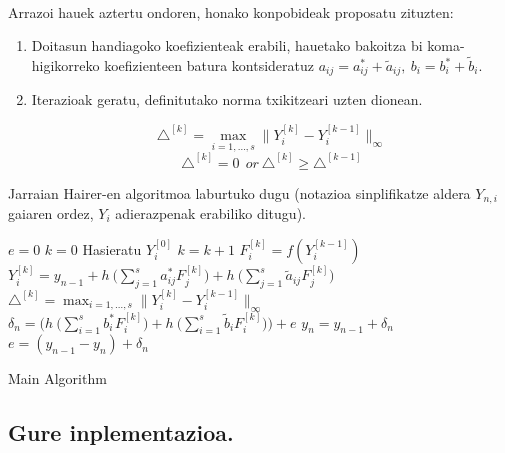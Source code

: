 \paragraph*{}Arrazoi hauek aztertu ondoren, honako konpobideak proposatu zituzten:

\begin{enumerate}
\item Doitasun handiagoko koefizienteak erabili, hauetako bakoitza bi koma-higikorreko koefizienteen batura kontsideratuz $a_{ij}= a^{\ast}_{ij}+\tilde a_{ij}, \ b_i= b^{\ast}_i+\tilde b_i$.
\item Iterazioak geratu, definitutako norma txikitzeari uzten dionean.

\[\triangle ^{[k]} = \max_{i=1,\dots,s}\|Y_i^{[k]}-Y_i^{[k-1]}\|_{\infty} \]
\begin{equation*}
\triangle^{[k]} = 0 \ \ or \  \triangle^{[k]} \geqslant \triangle^{[k-1]}
\end{equation*}
  	 	
\end{enumerate}

Jarraian Hairer-en algoritmoa laburtuko dugu  (notazioa sinplifikatze aldera $Y_{n,i}$ gaiaren ordez, $Y_i$ adierazpenak erabiliko ditugu).

\begin{algorithm}[h]
 \BlankLine
  $e=0$\;
  {
   \BlankLine
   $k=0$\;
   Hasieratu  $Y_{i}^{[0]}$\; 
   \BlankLine
   {
    \BlankLine 
    $k=k+1$\;
    $F_{i}^{[k]}=f(Y_{i}^{[k-1]}) $\;
    $Y_{i}^{[k]}=y_{n-1}+ h \ \big(\sum\limits_{j=1}^{s} a^{\ast}_{ij} F_{j}^{[k]} \big) 
                          + h \ \big(\sum\limits_{j=1}^{s} \tilde a_{ij} F_{j}^{[k]} \big)$\; 
    $\triangle ^{[k]} = \max_{i=1,\dots,s}\|Y_{i}^{[k]}-Y_{i}^{[k-1]}\|_{\infty}$\;
   }
   \BlankLine
    $\delta_{n}= \bigg(h \ \big(\sum\limits_{i=1}^{s} b^{\ast}_i F_{i}^{[k]} \big)
               + h \ \big(\sum\limits_{i=1}^{s} \tilde b_i F_{i}^{[k]} \big) \bigg)+e $\;
    $y_n=y_{n-1}+\delta_n$\;
    $e=(y_{n-1}-y_n)+\delta_n$\;            
   \BlankLine
 }
 \caption{Main Algorithm}
\end{algorithm}


\subsection{Gure inplementazioa.}

